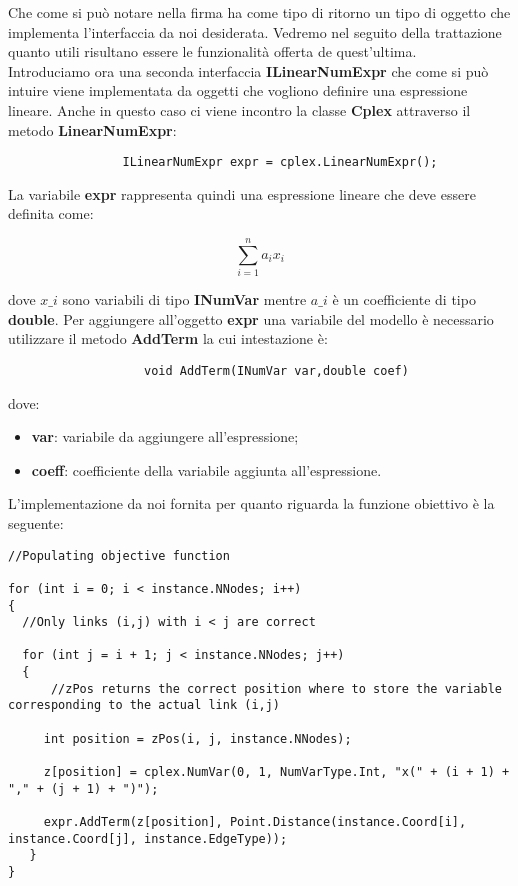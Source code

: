\documentclass[11pt]{article}
\begin{document}
Che come si può notare nella firma ha come tipo di ritorno un tipo di oggetto che implementa l'interfaccia da noi desiderata. Vedremo nel seguito della trattazione quanto utili risultano essere le funzionalità offerta de quest'ultima.\\
Introduciamo ora una seconda interfaccia \textbf{ILinearNumExpr} che come si può intuire viene implementata da oggetti che vogliono definire una espressione lineare. Anche in questo caso ci viene incontro la classe \textbf{Cplex} attraverso il metodo \textbf{LinearNumExpr}:
\begin{lstlisting}
                ILinearNumExpr expr = cplex.LinearNumExpr();
\end{lstlisting}

La variabile \textbf{expr} rappresenta quindi una espressione lineare che deve essere definita come:

$$\displaystyle{\sum_{i = 1}^n a_i x_i} $$

dove \textbf{$x\_i$} sono variabili di tipo \textbf{INumVar} mentre \textbf{$a\_i$} è un coefficiente di tipo \textbf{double}. Per aggiungere all'oggetto \textbf{expr} una variabile del modello è necessario utilizzare il metodo \textbf{AddTerm} la cui intestazione è:

\begin{lstlisting}
                   void AddTerm(INumVar var,double coef)
\end{lstlisting}

dove:

\begin{itemize}
\item \textbf{var}: variabile da aggiungere all'espressione;
\item  \textbf{coeff}: coefficiente della variabile aggiunta all'espressione.
\end{itemize}

L'implementazione da noi fornita per quanto riguarda la funzione obiettivo è la seguente:

\begin{lstlisting}
//Populating objective function

for (int i = 0; i < instance.NNodes; i++)
{
  //Only links (i,j) with i < j are correct
  
  for (int j = i + 1; j < instance.NNodes; j++)
  {
      //zPos returns the correct position where to store the variable corresponding to the actual link (i,j)
           
     int position = zPos(i, j, instance.NNodes);
           
     z[position] = cplex.NumVar(0, 1, NumVarType.Int, "x(" + (i + 1) + "," + (j + 1) + ")");
         
     expr.AddTerm(z[position], Point.Distance(instance.Coord[i], instance.Coord[j], instance.EdgeType));      
   }
}

\end{lstlisting}
\end{document}
